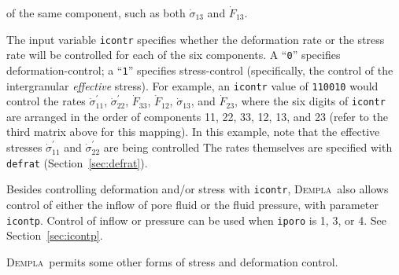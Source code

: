 \documentclass[letterpaper,11pt]{article}
\newcommand{\Dempla}{\textsc{Dempla}}
\newcommand{\RunFile}{\textsf{RunFile}}
\begin{document}
of the same component, such as both $\dot{\sigma}_{13}$ and $\dot{F}_{13}$.
%
\par
The input variable \texttt{icontr} specifies whether the deformation rate or the stress rate will be controlled for each of the six components.
A ``\texttt{0}'' specifies deformation-control;
a ``\texttt{1}'' specifies stress-control
(specifically, the control of the intergranular \emph{effective}
stress).
For example, an \texttt{icontr} value of \texttt{110010} would 
control the rates $\dot{\sigma}^{\prime}_{11}$,
$\dot{\sigma}^{\prime}_{22}$,
$\dot{F}_{33}$, $\dot{F}_{12}$,
$\dot{\sigma}_{13}$, and $\dot{F}_{23}$,
where the six digits of \texttt{icontr} are arranged in the
order of components \textrm{11}, \textrm{22}, \textrm{33}, \textrm{12},
\textrm{13}, and \textrm{23} (refer to the third matrix above
for this mapping).
In this example, note that the effective
stresses $\dot{\sigma}^{\prime}_{11}$ and $\dot{\sigma}^{\prime}_{22}$
are being controlled
The rates themselves are specified with \texttt{defrat} 
(Section~\ref{sec:defrat}).
%
\par
Besides controlling deformation and/or stress with \texttt{icontr},
\Dempla\ also allows control of either the inflow of pore fluid
or the fluid pressure, with parameter \texttt{icontp}.
Control of inflow or pressure can be used when
\texttt{iporo} is 1, 3, or 4.
See Section~\ref{sec:icontp}.
%
%
\par
\Dempla\ permits some other forms of stress and deformation control.
\end{document}
